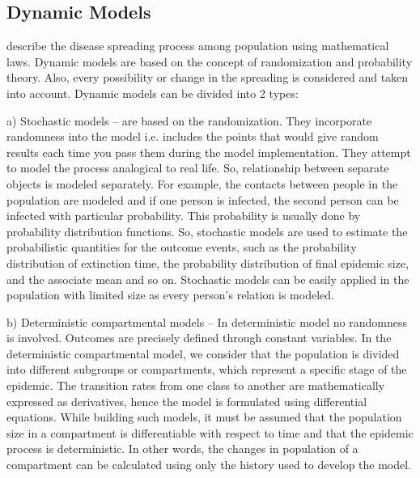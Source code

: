 \subsection{Dynamic Models}
describe the disease spreading process among population using mathematical laws. Dynamic models are based on the concept of randomization and probability theory. Also, every possibility or change in the spreading is considered and taken into account. Dynamic models can be divided into 2 types:

a) Stochastic models – are based on the randomization. They incorporate randomness into the model i.e. includes the points that would give random results each time you pass them during the model implementation. They attempt to model the process analogical to real life. So, relationship between separate objects is modeled separately. For example, the contacts between people in the population are modeled and if one person is infected, the second person can be infected with particular probability. This probability is usually done by probability distribution functions. So, stochastic models are used to estimate the probabilistic quantities for the outcome events, such as the probability distribution of extinction time, the probability distribution of final epidemic size, and the associate mean and so on. Stochastic models can be easily applied in the population with limited size as every person’s relation is modeled.

b) Deterministic compartmental models – In deterministic model no randomness is involved. Outcomes are precisely defined through constant variables. In the deterministic compartmental model, we consider that the population is divided into different subgroups or compartments, which represent a specific stage of the epidemic. The transition rates from one class to another are mathematically expressed as derivatives, hence the model is formulated using differential equations. While building such models, it must be assumed that the population size in a compartment is differentiable with respect to time and that the epidemic process is deterministic. In other words, the changes in population of a compartment can be calculated using only the history used to develop the model.